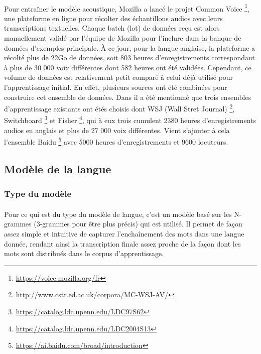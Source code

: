 		\paragraph{}
		Pour entraîner le modèle acoustique, Mozilla a lancé le projet Common Voice \footnote{\url{https://voice.mozilla.org/fr}}, une plateforme en ligne pour récolter des échantillons audios avec leurs transcriptions textuelles. Chaque batch (lot) de données reçu est alors manuellement validé par l'équipe de Mozilla pour l'inclure dans la banque de données d'exemples principale. À ce jour, pour la langue anglaise, la plateforme a récolté plus de 22Go de données, soit 803 heures d'enregistrements correspondant à plus de 30 000 voix différentes dont 582 heures ont été validées. Cependant, ce volume de données est relativement petit comparé à celui déjà utilisé pour l'apprentissage initial. En effet, plusieurs sources ont été combinées pour construire cet ensemble de données. Dans \citep{deepspeech_paper} il a été mentionné que trois ensembles d'apprentissage existants ont étés choisis dont WSJ (Wall Stret Journal) \footnote{\url{http://www.cstr.ed.ac.uk/corpora/MC-WSJ-AV/}}, Switchboard \footnote{\url{https://catalog.ldc.upenn.edu/LDC97S62}} et Fisher \footnote{\url{https://catalog.ldc.upenn.edu/LDC2004S13}}, qui à eux trois cumulent 2380 heures d'enregistrements audios en anglais et plus de 27 000 voix différentes. Vient s'ajouter à cela l'ensemble Baidu \footnote{\url{https://ai.baidu.com/broad/introduction}} avec 5000 heures d'enregistrements et 9600 locuteurs.
		
	\subsection{Modèle de la langue}
		\subsubsection*{Type du modèle}
		\paragraph{}
		
		Pour ce qui est du type du modèle de langue, c'est un modèle basé sur les N-grammes (3-grammes pour être plus précis) qui est utilisé. Il permet de façon assez simple et intuitive de capturer l'enchaînement des mots dans une langue donnée, rendant ainsi la transcription finale assez proche de la façon dont les mots sont distribués dans le corpus d'apprentissage.
		
